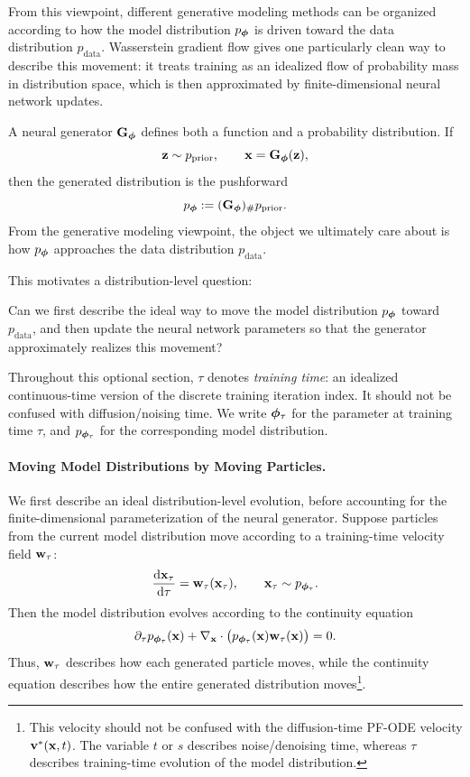 From this viewpoint, different generative modeling methods can be organized
according to how the model distribution $p_{{\bm{\phi}}}$ is driven toward the data
distribution $p_{\mathrm{data}}$.  Wasserstein gradient flow gives one
particularly clean way to describe this movement: it treats training as an
idealized flow of probability mass in distribution space, which is then
approximated by finite-dimensional neural network updates.


A neural generator ${\mathbf{G}}_{{\bm{\phi}}}$ defines both a function and a probability
distribution.  If
\[
    {\mathbf{z}}\sim p_{\mathrm{prior}},
    \qquad
    {\mathbf{x}}={\mathbf{G}}_{{\bm{\phi}}}({\mathbf{z}}),
\]
then the generated distribution is the pushforward
\[
    p_{{\bm{\phi}}}:=({\mathbf{G}}_{{\bm{\phi}}})_\# p_{\mathrm{prior}}.
\]
From the generative modeling viewpoint, the object we ultimately care about is
how $p_{{\bm{\phi}}}$ approaches the data distribution $p_{\mathrm{data}}$.

This motivates a distribution-level question:
\begin{question}
Can we first describe the ideal way to move the model distribution
$p_{{\bm{\phi}}}$ toward $p_{\mathrm{data}}$, and then update the neural network
parameters so that the generator approximately realizes this movement?
\end{question}

Throughout this optional section, $\tau$ denotes \emph{training time}: an
idealized continuous-time version of the discrete training iteration index.  It
should not be confused with diffusion/noising time.  We write ${\bm{\phi}}_\tau$ for
the parameter at training time $\tau$, and $p_{{\bm{\phi}}_\tau}$ for the
corresponding model distribution.

\paragraph{Moving Model Distributions by Moving Particles.}
We first describe an ideal distribution-level evolution, before accounting
for the finite-dimensional parameterization of the neural generator.
Suppose particles from the current model distribution move according to a
training-time velocity field ${\mathbf{w}}_\tau$:
\[
    \frac{\mathop{}\!\mathrm{d} {\mathbf{x}}_\tau}{\mathop{}\!\mathrm{d} \tau}
    =
    {\mathbf{w}}_\tau({\mathbf{x}}_\tau),
    \qquad
    {\mathbf{x}}_\tau\sim p_{{\bm{\phi}}_\tau}.
\]
Then the model distribution evolves according to the continuity equation
\[
    \partial_\tau p_{{\bm{\phi}}_\tau}({\mathbf{x}})
    +
    \nabla_{{\mathbf{x}}}\cdot
    \big(
        p_{{\bm{\phi}}_\tau}({\mathbf{x}}){\mathbf{w}}_\tau({\mathbf{x}})
    \big)
    =
    0.
\]
Thus, ${\mathbf{w}}_\tau$ describes how each generated particle moves, while the
continuity equation describes how the entire generated distribution moves\footnote{This velocity should not be confused with the diffusion-time PF-ODE velocity
${\mathbf{v}}^*({\mathbf{x}},t)$.  The variable $t$ or $s$ describes noise/denoising time,
whereas $\tau$ describes training-time evolution of the model distribution.}.



